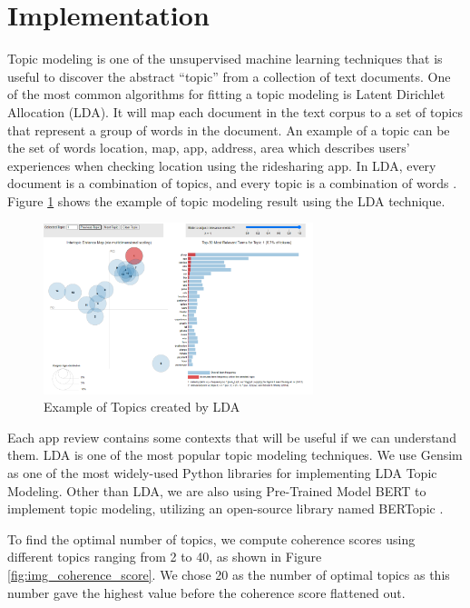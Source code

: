 \documentclass[12pt]{article}
\begin{document}
\section{Implementation}
Topic modeling is one of the unsupervised machine learning techniques that is useful to discover the abstract “topic” from a collection of text documents. One of the most common algorithms for fitting a topic modeling is Latent Dirichlet Allocation (LDA). It will map each document in the text corpus to a set of topics that represent a group of words in the document. An example of a topic can be the set of words {location, map, app, address, area} which describes users’ experiences when checking location using the ridesharing app. In LDA, every document is a combination of topics, and every topic is a combination of words \cite{text_mining_R}. Figure \ref{fig:img_lda_topic_modeling_example} shows the example of topic modeling result using the LDA technique.


\begin{figure}[h]
\begin{center}
\includegraphics[width=0.7\textwidth]{figures/image9.png}
\caption{Example of Topics created by LDA}
\label{fig:img_lda_topic_modeling_example}
\end{center}
\end{figure}

Each app review contains some contexts that will be useful if we can understand them. LDA is one of the most popular topic modeling techniques. We use Gensim as one of the most widely-used Python libraries for implementing LDA Topic Modeling. Other than LDA, we are also using Pre-Trained Model BERT to implement topic modeling, utilizing an open-source library named BERTopic \cite{bertopic}.

To find the optimal number of topics, we compute coherence scores using different topics ranging from 2 to 40, as shown in Figure \ref{fig:img_coherence_score}. We chose 20 as the number of optimal topics as this number gave the highest value before the coherence score flattened out.
\newline
\end{document}
